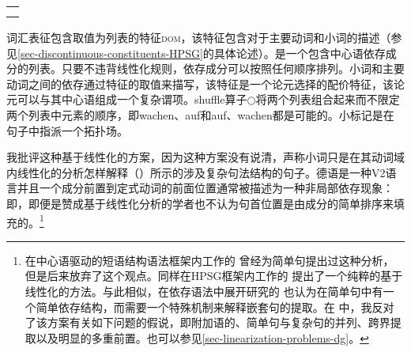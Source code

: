 \begin{exe}
\begin{xlist}[iv.]
\begin{exe}
\begin{xlist}[iv.]
\begin{tabular}{@{}l@{}}
{{{                    }
            }\\
}
\end{tabular}
\zs
词汇表征包含取值为列表的特征\textsc{dom}，该特征包含对于主要动词和小词的描述（参见\ref{sec-discontinuous-constituents-HPSG}的具体论述）。\domlc 是一个包含中心语依存成分的列表。只要不违背线性化规则，依存成分可以按照任何顺序排列\citep{Reape94a}。小词和主要动词之间的依存通过特征\vcompc 的取值来描写，该特征是一个论元选择的配价特征，该论元可以与其中心语组成一个复杂谓项。shuffle算子$\bigcirc$将两个列表组合起来而不限定两个列表中元素的顺序，即wachen、auf和auf、wachen都是可能的。小标记是在句子中指派一个拓扑场。

我批评这种基于线性化的方案，因为这种方案没有说清，声称小词只是在其动词域内线性化的分析怎样解释（）所示的涉及复杂句法结构的句子\citep{Mueller2007d}。德语是一种V2语言并且一个成分前置到定式动词的前面位置通常被描述为一种非局部依存现象：即，即便是赞成基于线性化分析的学者也不认为句首位置是由成分的简单排序来填充的\citep{Kathol2000a,Mueller99a,Mueller2002b,TBjerre2006a}。\footnote{%
  在中心语驱动的短语结构语法\indexhpsg 框架内工作的 \citet[\S~6.3]{Kathol95a}曾经为简单句提出过这种分析，但是后来放弃了这个观点。同样在HPSG框架内工作的 \citet{Wetta2011a}提出了一个纯粹的基于线性化的方法。与此相似，在依存语法\indexdg 中展开研究的 \citet{GO2009a}也认为在简单句中有一个简单依存结构，而需要一个特殊机制来解释嵌套句的提取。在 中，我反对了该方案有关如下问题的假说，即附加语的、简单句与复杂句的并列、跨界提取以及明显的多重前置。也可以参见\ref{sec-linearization-problems-dg}。
}


\end{xlist}
\end{exe}
\end{xlist}
\end{exe}
